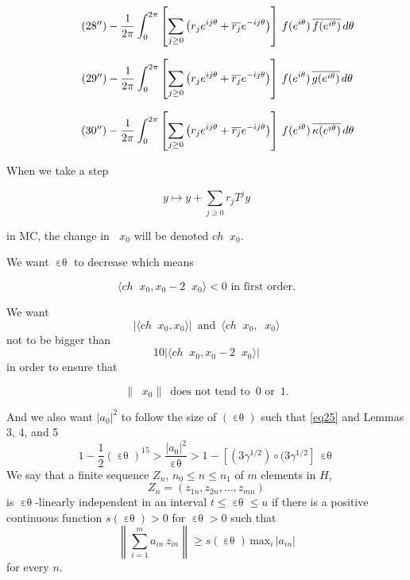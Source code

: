 \documentclass[12pt,oneside,reqno]{amsart}
\theoremstyle{definition}
\DeclareMathOperator*{\VV}{[\,\, ]^{-1}}
\DeclareMathOperator*{\VE}{\varepsilon\theta}
\begin{document}
\begin{equation}\label{eq28primeprime}\tag{28$^{\prime\prime}$}
	-\frac{1}{2\pi} \int_{0}^{2\pi} \left[ \sum_{j \ge 0} \left(
	r_j e^{i j \theta} + \overline{r_j} e^{- i j \theta} \right) \right]  \, f(e^{i\theta}) \, \overline{f(e^{i\theta})} \, d\theta
\end{equation}

\begin{equation}\label{eq29primeprime}\tag{29$^{\prime\prime}$}
	-\frac{1}{2\pi} \int_{0}^{2\pi} \left[ \sum_{j \ge 0} \left(
	r_j e^{i j \theta} + \overline{r_j} e^{- i j \theta} \right) \right]  \, f(e^{i\theta}) \, \overline{g(e^{i\theta})} \, d\theta
\end{equation}

\begin{equation}\label{eq30primeprime}\tag{30$^{\prime\prime}$}
	-\frac{1}{2\pi} \int_{0}^{2\pi} \left[ \sum_{j \ge 0} \left(
	r_j e^{i j \theta} + \overline{r_j} e^{- i j \theta} \right) \right]  \, f(e^{i\theta}) \, \overline{\kappa (e^{i\theta})} \, d\theta
\end{equation}

When we take a step

$$y \mapsto y + \sum_{j \ge 0} r_j T^j y$$

in MC, the change in $\VV x_0$ will be denoted $ch\VV x_0$.

We want $\VE$ to decrease which means

\begin{equation}\label{eq31}
\langle ch\VV x_0, x_0 - 2 \VV x_0\rangle < 0 \text{ in first order.}
\end{equation}

We want 
$$\left| \langle ch\VV x_0, x_0\rangle  \right| \, \text{ and } \, \langle ch\VV x_0, \VV x_0\rangle $$ not to be bigger than
$$10 |\langle ch\VV x_0, x_0 - 2 \VV x_0\rangle |$$
in order to ensure that 

\begin{equation}\label{eq32}
	\|\VV x_0\| \, \text{ does not tend to } \, 0 \text{ or }\, 1.
\end{equation} 

And we also want $|a_0|^2$ to follow the size of  $(\VE)$ such that \eqref{eq25} and Lemmas 3, 4, and 5
\begin{equation}\label{eq33}
	1 - \frac{1}{2} (\VE)^{15} > \frac{|a_0|^2}{\VE} > 1 - \left[ (3 \gamma^{1/2}) \circ (3 \gamma^{1/2} \right]\, \VE
\end{equation}
We say that a finite sequence $Z_n$, $n_0 \le n \le n_1$ of $m$ elements in $H$,
$$Z_n = \left( z_{1 n}, z_{2 n}, \ldots, z_{m n} \right)$$
is $\VE$-linearly independent in an interval $t \le \VE \le u$ if there is a positive continuous function $s(\VE)>0$ for $\VE > 0$ such that
$$\left\| \sum_{i=1}^{m} a_{i n} \, z_{i n}\right\| \ge s(\VE) \, \text{max}_i \, |a_{i n}|$$
for  every $n$.
\end{document}
